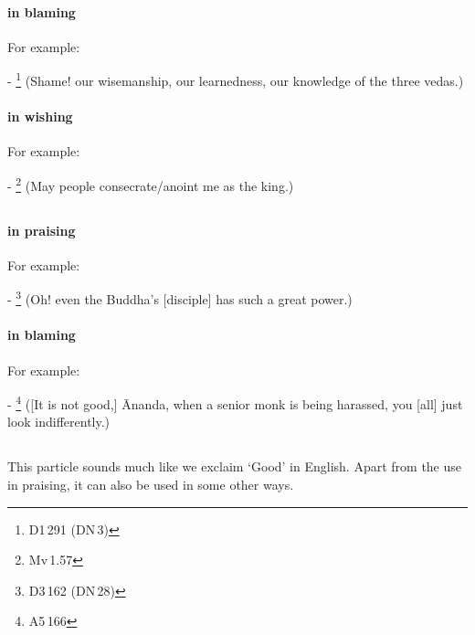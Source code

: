 \paragraph*{ in blaming} For example:\par
- \footnote{D1\,291 (DN\,3)} (Shame! our wisemanship, our learnedness, our knowledge of the three vedas.) \par
\paragraph*{ in wishing} For example:\par
- \footnote{Mv\,1.57} (May people consecrate/anoint me as the king.) \par

\subsection*{}\label{nip:naama}
\paragraph*{ in praising} For example:\par
- \footnote{D3\,162 (DN\,28)} (Oh! even the Buddha's [disciple] has such a great power.) \par
\paragraph*{ in blaming} For example:\par
- \footnote{A5\,166} ([It is not good,] \=Ananda, when a senior monk is being harassed, you [all] just look indifferently.) \par

\subsection*{}\label{nip:saadhu}
This particle sounds much like we exclaim `Good' in English. Apart from the use in praising, it can also be used in some other ways.
